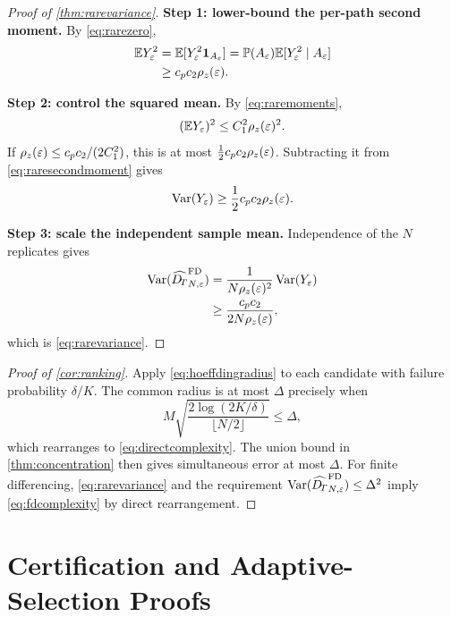 \begin{proof}[Proof of \cref{thm:rarevariance}]
\textbf{Step 1: lower-bound the per-path second moment.}
By \cref{eq:rarezero},
\begin{align}
 \mathbb{E} Y_\varepsilon^2
 &=\mathbb{E}[Y_\varepsilon^2\mathbf 1_{A_\varepsilon}]
 =\mathbb{P}(A_\varepsilon)\mathbb{E}[Y_\varepsilon^2\mid A_\varepsilon]\\
 &\ge c_p c_2\rho_z(\varepsilon).
 \label{eq:raresecondmoment}
\end{align}

\textbf{Step 2: control the squared mean.}
By \cref{eq:raremoments},
\begin{equation}
 (\mathbb{E} Y_\varepsilon)^2\le C_1^2\rho_z(\varepsilon)^2.
\end{equation}
If $\rho_z(\varepsilon)\le c_pc_2/(2C_1^2)$, this is at most
$\tfrac12c_pc_2\rho_z(\varepsilon)$.  Subtracting it from
\cref{eq:raresecondmoment} gives
\begin{equation}
 \operatorname{Var}(Y_\varepsilon)\ge\frac12c_pc_2\rho_z(\varepsilon).
 \label{eq:rareperpathvariance}
\end{equation}

\textbf{Step 3: scale the independent sample mean.}
Independence of the $N$ replicates gives
\begin{align}
 \operatorname{Var}(\widehat{D_{\!T}}^{\mathrm{FD}}_{N,\varepsilon})
 &=\frac{1}{N\rho_z(\varepsilon)^2}\operatorname{Var}(Y_\varepsilon)\\
 &\ge\frac{c_pc_2}{2N\rho_z(\varepsilon)},
\end{align}
which is \cref{eq:rarevariance}.
\end{proof}

\begin{proof}[Proof of \cref{cor:ranking}]
Apply \cref{eq:hoeffdingradius} to each candidate with failure probability
$\delta/K$.  The common radius is at most $\Delta$ precisely when
\begin{equation}
 M\sqrt{\frac{2\log(2K/\delta)}{\lfloor N/2\rfloor}}
 \le\Delta,
\end{equation}
which rearranges to \cref{eq:directcomplexity}.  The union bound in
\cref{thm:concentration} then gives simultaneous error at most $\Delta$.
For finite differencing, \cref{eq:rarevariance} and the requirement
$\operatorname{Var}(\widehat{D_{\!T}}^{\mathrm{FD}}_{N,\varepsilon})\le\Delta^2$ imply
\cref{eq:fdcomplexity} by direct rearrangement.
\end{proof}

\section{Certification and Adaptive-Selection Proofs}
\label{app:certificate}

